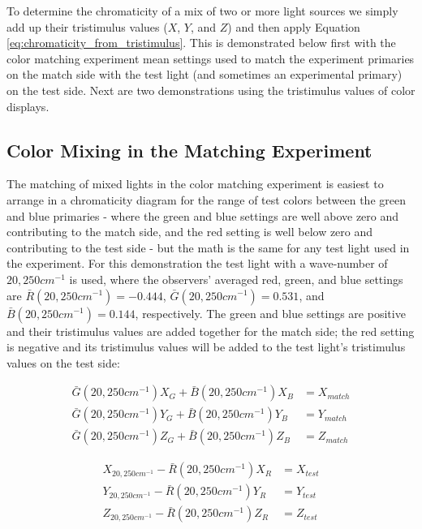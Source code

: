\documentclass{article}
\begin{document}
\begin{multicols}{2}

To determine the chromaticity of a mix of two or more light sources we simply add up their tristimulus values ($X$, $Y$, and $Z$) and then apply Equation \ref{eq:chromaticity_from_tristimulus}.  This is demonstrated below first with the color matching experiment mean settings used to match the experiment primaries on the match side with the test light (and sometimes an experimental primary) on the test side.  Next are two demonstrations using the tristimulus values of color displays.

\subsection{Color Mixing in the Matching Experiment} %

The matching of mixed lights in the color matching experiment is easiest to arrange in a chromaticity diagram for the range of test colors between the green and blue primaries - where the green and blue settings are well above zero and contributing to the match side, and the red setting is well below zero and contributing to the test side - but the math is the same for any test light used in the experiment.  For this demonstration the test light with a wave-number of $20,250cm^{-1}$ is used, where the observers' averaged red, green, and blue settings are $\bar{R}(20,250cm^{-1})=-0.444$, $\bar{G}(20,250cm^{-1})=0.531$, and $\bar{B}(20,250cm^{-1})=0.144$, respectively.  The green and blue settings are positive and their tristimulus values are added together for the match side; the red setting is negative and its tristimulus values will be added to the test light's tristimulus values on the test side:

\begin{equation}\label{eq:match_tristimulus} %
    \begin{aligned}
        \bar{G}(20,250cm^{-1})X_G+\bar{B}(20,250cm^{-1})X_B&=X_{match}\\
        \bar{G}(20,250cm^{-1})Y_G+\bar{B}(20,250cm^{-1})Y_B&=Y_{match}\\
        \bar{G}(20,250cm^{-1})Z_G+\bar{B}(20,250cm^{-1})Z_B&=Z_{match}
    \end{aligned}
\end{equation}

\begin{equation}\label{eq:test_tristimulus} %
    \begin{aligned}
        X_{20,250cm^{-1}}-\bar{R}(20,250cm^{-1})X_R&=X_{test}\\
        Y_{20,250cm^{-1}}-\bar{R}(20,250cm^{-1})Y_R&=Y_{test}\\
        Z_{20,250cm^{-1}}-\bar{R}(20,250cm^{-1})Z_R&=Z_{test}
    \end{aligned}
\end{equation}


\end{multicols}
\end{document}
